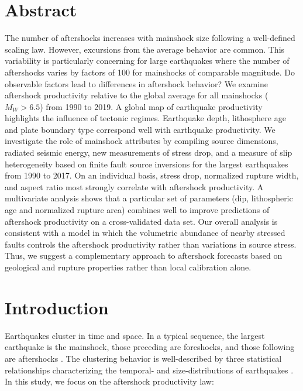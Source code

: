 \documentclass[draft, jgrga]{agujournal2018}
\begin{document}
\justify

\section*{Abstract}

The number of aftershocks increases with mainshock size following a well-defined scaling law. However, excursions from the average behavior are common. This variability is particularly concerning for large earthquakes where the number of aftershocks varies by factors of 100 for mainshocks of comparable magnitude. Do observable factors lead to differences in aftershock behavior? We examine aftershock productivity relative to the global average for all mainshocks ($M_W>6.5$) from 1990 to 2019. A global map of earthquake productivity highlights the influence of tectonic regimes. Earthquake depth, lithosphere age and plate boundary type correspond well with earthquake productivity. We investigate the role of mainshock attributes by compiling source dimensions, radiated seismic energy, new measurements of stress drop, and a measure of slip heterogeneity based on finite fault source inversions for the largest earthquakes from 1990 to 2017. On an individual basis, stress drop, normalized rupture width, and aspect ratio most strongly correlate with aftershock productivity. A multivariate analysis shows that a particular set of parameters (dip, lithospheric age and normalized rupture area) combines well to improve predictions of aftershock productivity on a cross-validated data set. Our overall analysis is consistent with a model in which the volumetric abundance of nearby stressed faults controls the aftershock productivity rather than variations in source stress. Thus, we suggest a complementary approach to aftershock forecasts based on geological and rupture properties rather than local calibration alone.

\section{Introduction}

Earthquakes cluster in time and space. In a typical sequence, the largest earthquake is the mainshock, those preceding are foreshocks, and those following are aftershocks \citep{Omori1895}. The clustering behavior is well-described by three statistical relationships characterizing the temporal- and size-distributions of earthquakes \citep[e.g.,][]{Ogata1988}. In this study, we focus on the aftershock productivity law:
\end{document}
